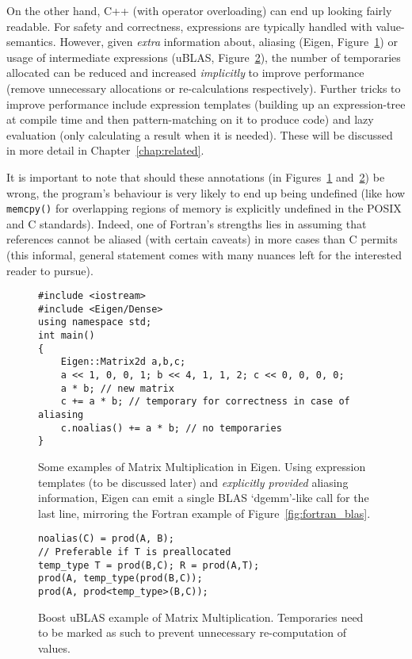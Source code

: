 On the other hand, C++ (with operator overloading) can end up looking fairly
readable. For safety and correctness, expressions are typically handled with
value-semantics. However, given \emph{extra} information about, aliasing
(Eigen, Figure~\ref{fig:cpp_eigen}) or usage of intermediate expressions
(uBLAS, Figure~\ref{fig:cpp_ublas}), the number of temporaries allocated can be
reduced and increased \emph{implicitly} to improve performance (remove
unnecessary allocations or re-calculations respectively). Further tricks to
improve performance include expression templates (building up an
expression-tree at compile time and then pattern-matching on it to produce
code) and lazy evaluation (only calculating a result when it is needed). These
will be discussed in more detail in Chapter~\ref{chap:related}.

It is important to note that should these annotations (in
Figures~\ref{fig:cpp_eigen} and~\ref{fig:cpp_ublas}) be wrong, the program's
behaviour is very likely to end up being undefined (like how \texttt{memcpy()}
for overlapping regions of memory is explicitly undefined in the POSIX and C
standards). Indeed, one of Fortran's strengths lies in assuming that references
cannot be aliased (with certain caveats) in more cases than C permits (this
informal, general statement comes with many nuances left for the interested
reader to pursue).

\begin{figure}[tp]
    \begin{verbatim}
#include <iostream>
#include <Eigen/Dense>
using namespace std;
int main()
{
    Eigen::Matrix2d a,b,c;
    a << 1, 0, 0, 1; b << 4, 1, 1, 2; c << 0, 0, 0, 0;
    a * b; // new matrix
    c += a * b; // temporary for correctness in case of aliasing
    c.noalias() += a * b; // no temporaries
}
    \end{verbatim}
    \caption{Some examples of Matrix Multiplication in Eigen. Using expression
        templates (to be discussed later) and \emph{explicitly provided} aliasing
        information, Eigen can emit a single BLAS `dgemm'-like call for the last
	line, mirroring the Fortran example of
	Figure~\ref{fig:fortran_blas}.}\label{fig:cpp_eigen}
\end{figure}

\begin{figure}[tbp]
    \begin{verbatim}
noalias(C) = prod(A, B);
// Preferable if T is preallocated
temp_type T = prod(B,C); R = prod(A,T);
prod(A, temp_type(prod(B,C));
prod(A, prod<temp_type>(B,C));
    \end{verbatim}
    \caption{Boost uBLAS example of Matrix Multiplication. Temporaries need to
        be marked as such to prevent unnecessary re-computation of
        values.}\label{fig:cpp_ublas}
\end{figure}

